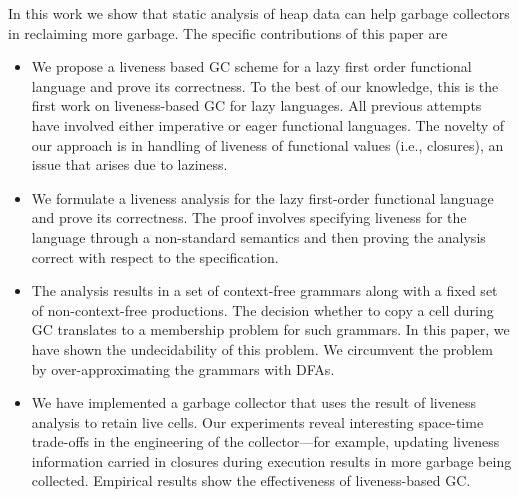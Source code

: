 \documentclass[9pt]{sigplanconf}
\newcommand{\added}[1]{#1}
\begin{document}
In  this work  we show  that  static analysis  of heap  data can  help
garbage  collectors   in  reclaiming   more  garbage.    The  specific
contributions of this paper are
\added{
\begin{itemize}
\item We propose a liveness based GC scheme for a lazy
  first order functional  language and prove its  correctness.  To the
  best  of our  knowledge, this  is the  first work  on liveness-based
  GC   for    lazy    languages.    All    previous
  attempts~\cite{shaham01heap,  ran.shaham-sas03,  shaham02estimating,
    asati14lgc,    karkare06effectiveness}   have    involved   either
  imperative  or  eager  functional  languages.   The  novelty  of  our
  approach is in  handling of  liveness of  functional values  (i.e.,
  closures), an issue that arises due to laziness.

\item  We  formulate a  liveness  analysis  for the  lazy  first-order
  functional language  and prove  its correctness. The  proof involves
  specifying  liveness   for  the  language  through   a  non-standard
  semantics and then proving the  analysis correct with respect to the
  specification.

\item The  analysis results  in a set  of context-free  grammars along
  with  a fixed  set  of non-context-free  productions.  The  decision
  whether to  copy a  cell during GC translates  to a
  membership problem for such grammars.   In this paper, we have shown
  the undecidability  of this  problem. We  circumvent the  problem by
  over-approximating the grammars with DFAs.

\item We have implemented a garbage  collector that uses the result of
  liveness  analysis to  retain  live cells.   Our experiments  reveal
  interesting  space-time   trade-offs  in  the  engineering   of  the
  collector---for  example, updating  liveness information  carried in
  closures during  execution results in more  garbage being collected.
  Empirical results  show the effectiveness of  liveness-based GC.
\end{itemize}
}
\end{document}
